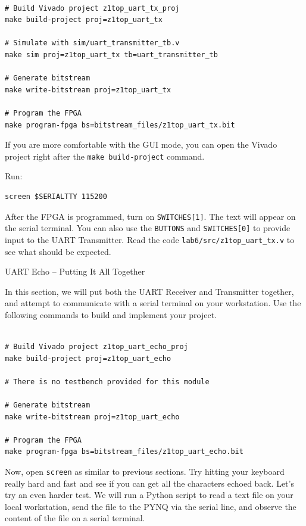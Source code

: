 \documentclass[11pt]{article}
\makeatletter
\renewcommand{\subsection}
{\@startsection {subsection}{1}{0pt}
 {-1ex}
 {0.5ex}
 {\bfseries\normalsize}}
\makeatother
\begin{document}
\begin{verbatim}

# Build Vivado project z1top_uart_tx_proj
make build-project proj=z1top_uart_tx

# Simulate with sim/uart_transmitter_tb.v
make sim proj=z1top_uart_tx tb=uart_transmitter_tb

# Generate bitstream
make write-bitstream proj=z1top_uart_tx

# Program the FPGA
make program-fpga bs=bitstream_files/z1top_uart_tx.bit
\end{verbatim}

If you are more comfortable with the GUI mode, you can open the Vivado project right after the \texttt{make build-project} command.

Run:

\begin{verbatim}
screen $SERIALTTY 115200
\end{verbatim}

After the FPGA is programmed, turn on \verb|SWITCHES[1]|. The text will appear on the serial terminal. You can also use the \verb|BUTTONS| and \verb|SWITCHES[0]| to provide input to the UART Transmitter. Read the code \verb|lab6/src/z1top_uart_tx.v| to see what should be expected.

\subsection{UART Echo -- Putting It All Together}

In this section, we will put both the UART Receiver and Transmitter together, and attempt to communicate with a serial terminal on your workstation. Use the following commands to build and implement your project.

\begin{verbatim}

# Build Vivado project z1top_uart_echo_proj
make build-project proj=z1top_uart_echo

# There is no testbench provided for this module

# Generate bitstream
make write-bitstream proj=z1top_uart_echo

# Program the FPGA
make program-fpga bs=bitstream_files/z1top_uart_echo.bit
\end{verbatim}

Now, open \verb|screen| as similar to previous sections. Try hitting your keyboard really hard and fast and see if you can get all the characters echoed back. Let's try an even harder test. We will run a Python script to read a text file on your local workstation, send the file to the PYNQ via the serial line, and observe the content of the file on a serial terminal.
\end{document}
